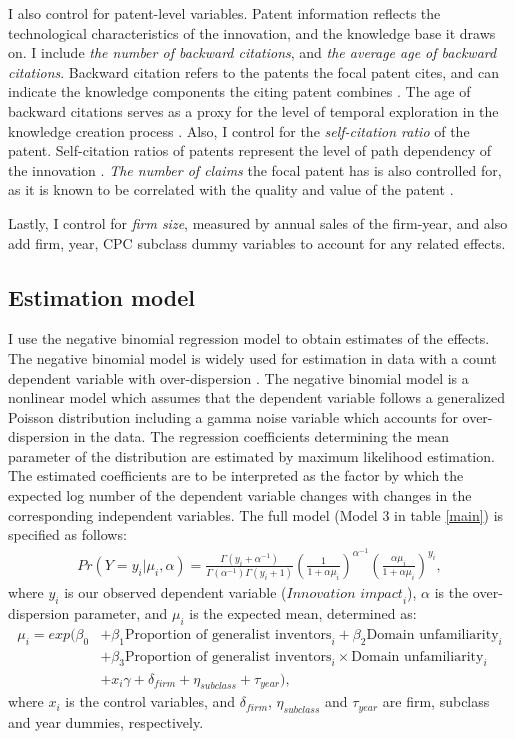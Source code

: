 \documentclass{article}
\begin{document}
I also control for patent-level variables. Patent information reflects the technological characteristics of the innovation, and the knowledge base it draws on. I include \textit{the number of backward citations}, and \textit{the average age of backward citations}. Backward citation refers to the patents the focal patent cites, and can indicate the knowledge components the citing patent combines \autocite{Fleming2001,Kaplan2015,Hall2001}. The age of backward citations serves as a proxy for the level of temporal exploration in the knowledge creation process \autocite{Nerkar2003}.
Also, I control for the \textit{self-citation ratio} of the patent. Self-citation ratios of patents represent the level of path dependency of the innovation \autocite{Soerensen2000,Song2003}.
\textit{The number of claims} the focal patent has is also controlled for, as it is known to be correlated with the quality and value of the patent \autocite{Lanjouw1999}.

Lastly, I control for \textit{firm size}, measured by annual sales of the firm-year, and also add firm, year, CPC subclass dummy variables to account for any related effects.

\subsection{Estimation model}
I use the negative binomial regression model to obtain estimates of the effects. The negative binomial model is widely used for estimation in data with a count dependent variable with over-dispersion \autocite{Cameron2001}. The negative binomial model is a nonlinear model which assumes that the dependent variable follows a generalized Poisson distribution including a gamma noise variable which accounts for over-dispersion in the data. The regression coefficients determining the mean parameter of the distribution are estimated by maximum likelihood estimation. The estimated coefficients are to be interpreted as the factor by which the expected log number of the dependent variable changes with changes in the corresponding independent variables.
The full model (Model 3 in table \ref{main}) is specified as follows:
\begin{align*}
    Pr(Y=y_i|\mu_i,\alpha) = \frac{\Gamma(y_i+\alpha^{-1})}{\Gamma(\alpha^{-1})\Gamma(y_i+1)} \left(\frac{1}{1+\alpha\mu_i}\right)^{\alpha^{-1}} \left(\frac{\alpha\mu_i}{1+\alpha\mu_i}\right)^{y_i},
\end{align*}
where $y_i$ is our observed dependent variable ($\textit{Innovation impact}_i$), $\alpha$ is the over-dispersion parameter, and $\mu_i$ is the expected mean, determined as:
\begin{align*}
    \mu_i = exp(\beta_0 &+ \beta_1\text{Proportion of generalist inventors}_i + \beta_2\text{Domain unfamiliarity}_i\\
    &+ \beta_3\text{Proportion of generalist inventors}_i\times\text{Domain unfamiliarity}_i \\
    &+ x_i\gamma + \delta_{firm} + \eta_{subclass} + \tau_{year}),
\end{align*}
where $x_i$ is the control variables, and $\delta_{firm}$, $\eta_{subclass}$ and $\tau_{year}$ are firm, subclass and year dummies, respectively.
\end{document}
